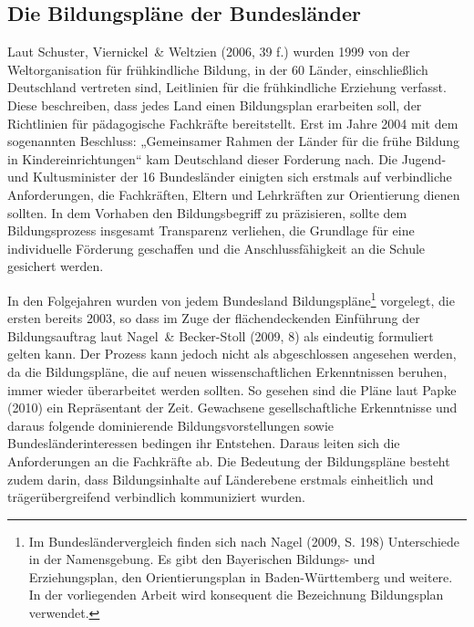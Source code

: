 \subsection{Die Bildungspläne der Bundesländer}
Laut Schuster, Viernickel~\& Weltzien (2006, 39 f.) wurden 1999 von der Weltorganisation für frühkindliche Bildung, in der 60 Länder, einschließlich Deutschland vertreten sind, Leitlinien für die frühkindliche Erziehung verfasst. Diese beschreiben, dass jedes Land einen Bildungsplan erarbeiten soll, der Richtlinien für pädagogische Fachkräfte bereitstellt. Erst im Jahre 2004 mit dem sogenannten Beschluss: „Gemeinsamer Rahmen der Länder für die frühe Bildung in Kindereinrichtungen“ kam Deutschland dieser Forderung nach. Die Jugend- und Kultusminister der 16 Bundesländer einigten sich erstmals auf verbindliche Anforderungen, die Fachkräften, Eltern und Lehrkräften zur Orientierung dienen sollten. In dem Vorhaben den Bildungsbegriff zu präzisieren, sollte dem Bildungsprozess insgesamt Transparenz verliehen, die Grundlage für eine individuelle Förderung geschaffen und die Anschlussfähigkeit an die Schule gesichert werden. 

In den Folgejahren wurden von jedem Bundesland Bildungspläne\footnote{Im Bundesländervergleich finden sich nach Nagel (2009, S. 198) Unterschiede in der Namensgebung. Es gibt den Bayerischen Bildungs- und Erziehungsplan, den Orientierungsplan in Baden-Württemberg und weitere. In der vorliegenden Arbeit wird konsequent die Bezeichnung Bildungsplan verwendet.} vorgelegt, die ersten bereits 2003, so dass im Zuge der flächendeckenden Einführung der Bildungsauftrag laut Nagel~\& Becker-Stoll (2009, 8) als eindeutig formuliert gelten kann. Der Prozess kann jedoch nicht als abgeschlossen angesehen werden, da die Bildungspläne, die auf neuen wissenschaftlichen Erkenntnissen beruhen, immer wieder überarbeitet werden sollten. So gesehen sind die Pläne laut Papke (2010) ein Repräsentant der Zeit. Gewachsene gesellschaftliche Erkenntnisse und daraus folgende dominierende Bildungsvorstellungen sowie Bundesländerinteressen bedingen ihr Entstehen. Daraus leiten sich die Anforderungen an die Fachkräfte ab. Die Bedeutung der Bildungspläne besteht zudem darin, dass Bildungsinhalte auf Länderebene erstmals einheitlich und trägerübergreifend verbindlich kommuniziert wurden. 

